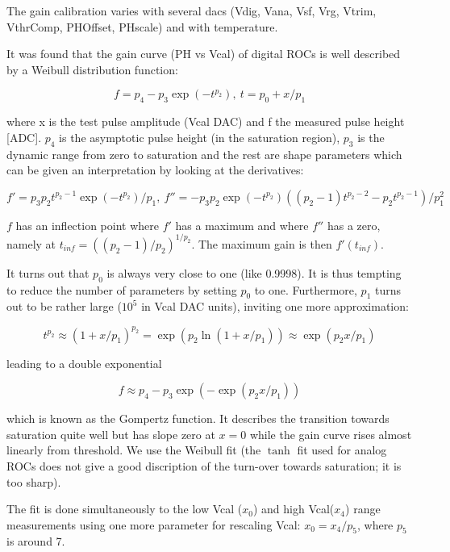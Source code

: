 \documentclass[english]{article}
\begin{document}
The gain calibration varies with several dacs (Vdig, Vana, Vsf, Vrg,
Vtrim, VthrComp, PHOffset, PHscale) and with temperature.

It was found that the gain curve (PH vs Vcal) of digital ROCs is well
described by a Weibull distribution function:

\[
f=p_{4}-p_{3}\exp(-t^{p_{2}}),\: t=p_{0}+x/p_{1}\]


where x is the test pulse amplitude (Vcal DAC) and f the measured
pulse height {[}ADC{]}. $p_{4}$ is the asymptotic pulse height (in
the saturation region), $p_{3}$ is the dynamic range from zero to
saturation and the rest are shape parameters which can be given an
interpretation by looking at the derivatives:

\[
f'=p_{3}p_{2}t^{p_{2}-1}\exp(-t^{p_{2}})/p_{1},\: f''=-p_{3}p_{2}\exp(-t^{p_{2}})\left((p_{2}-1)t^{p_{2}-2}-p_{2}t^{p_{2}-1}\right)/p_{1}^{2}\]


$f$ has an inflection point where $f'$ has a maximum and where $f''$
has a zero, namely at $t_{inf}=\left((p_{2}-1)/p_{2}\right)^{1/p_{2}}$.
The maximum gain is then $f'(t_{inf})$.

It turns out that $p_{0}$ is always very close to one (like 0.9998).
It is thus tempting to reduce the number of parameters by setting
$p_{0}$ to one. Furthermore, $p_{1}$ turns out to be rather large
($10^{5}$ in Vcal DAC units), inviting one more approximation:

\[
t^{p_{2}}\approx\left(1+x/p_{1}\right)^{p_{2}}=\exp\left(p_{2}\ln(1+x/p_{1})\right)\approx\exp\left(p_{2}x/p_{1}\right)\]


leading to a double exponential

\[
f\approx p_{4}-p_{3}\exp\left(-\exp(p_{2}x/p_{1})\right)\]


which is known as the Gompertz function. It describes the transition
towards saturation quite well but has slope zero at $x=0$ while the
gain curve rises almost linearly from threshold. We use the Weibull
fit (the $\tanh$ fit used for analog ROCs does not give a good discription
of the turn-over towards saturation; it is too sharp).

The fit is done simultaneously to the low Vcal ($x_{0}$) and high
Vcal($x_{4}$) range measurements using one more parameter for rescaling
Vcal: $x_{0}=x_{4}/p_{5}$, where $p_{5}$ is around 7.
\end{document}

